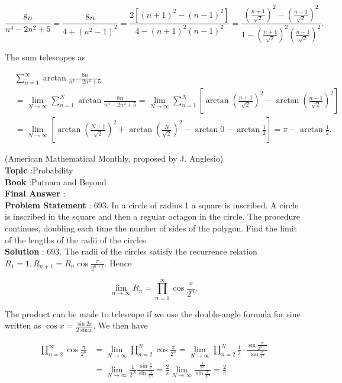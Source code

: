 \documentclass[10pt]{article}
\begin{document}
$$
\frac{8 n}{n^{4}-2 n^{2}+5}=\frac{8 n}{4+\left(n^{2}-1\right)^{2}}=\frac{2\left[(n+1)^{2}-(n-1)^{2}\right]}{4-(n+1)^{2}(n-1)^{2}}=\frac{\left(\frac{n+1}{\sqrt{2}}\right)^{2}-\left(\frac{n-1}{\sqrt{2}}\right)^{2}}{1-\left(\frac{n+1}{\sqrt{2}}\right)^{2}\left(\frac{n-1}{\sqrt{2}}\right)^{2}} .
$$

The sum telescopes as

$$
\begin{aligned}
&\sum_{n=1}^{\infty} \arctan \frac{8 n}{n^{4}-2 n^{2}+5} \\
&=\lim _{N \rightarrow \infty} \sum_{n=1}^{N} \arctan \frac{8 n}{n^{4}-2 n^{2}+5}=\lim _{N \rightarrow \infty} \sum_{n=1}^{N}\left[\arctan \left(\frac{n+1}{\sqrt{2}}\right)^{2}-\arctan \left(\frac{n-1}{\sqrt{2}}\right)^{2}\right] \\
&=\lim _{N \rightarrow \infty}\left[\arctan \left(\frac{N+1}{\sqrt{2}}\right)^{2}+\arctan \left(\frac{N}{\sqrt{2}}\right)^{2}-\arctan 0-\arctan \frac{1}{2}\right]=\pi-\arctan \frac{1}{2} .
\end{aligned}
$$

(American Mathematical Monthly, proposed by J. Anglesio)
\\
\textbf{Topic} :Probability\\
\textbf{Book} :Putnam and Beyond\\
\textbf{Final Answer} :\\


\textbf{Problem Statement} :
693. In a circle of radius 1 a square is inscribed. A circle is inscribed in the square and then a regular octagon in the circle. The procedure continues, doubling each time the number of sides of the polygon. Find the limit of the lengths of the radii of the circles.
\\
\textbf{Solution} :
693. The radii of the circles satisfy the recurrence relation $R_{1}=1, R_{n+1}=R_{n} \cos \frac{\pi}{2^{n+1}}$. Hence 

$$
\lim _{n \rightarrow \infty} R_{n}=\prod_{n=1}^{\infty} \cos \frac{\pi}{2^{n}} .
$$

The product can be made to telescope if we use the double-angle formula for sine written as $\cos x=\frac{\sin 2 x}{2 \sin x}$. We then have

$$
\begin{aligned}
\prod_{n=2}^{\infty} \cos \frac{\pi}{2^{n}} &=\lim _{N \rightarrow \infty} \prod_{n=2}^{N} \cos \frac{\pi}{2^{n}}=\lim _{N \rightarrow \infty} \prod_{n=2}^{N} \frac{1}{2} \cdot \frac{\sin \frac{\pi}{2^{n-1}}}{\sin \frac{\pi}{2^{n}}} \\
&=\lim _{N \rightarrow \infty} \frac{1}{2^{N}} \frac{\sin \frac{\pi}{2}}{\sin \frac{\pi}{2^{N}}}=\frac{2}{\pi} \lim _{N \rightarrow \infty} \frac{\frac{\pi}{2^{N}}}{\sin \frac{\pi}{2^{N}}}=\frac{2}{\pi} .
\end{aligned}
$$
\end{document}
